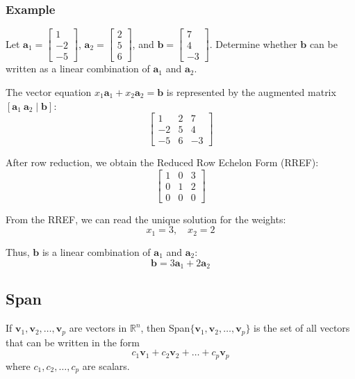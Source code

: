\documentclass[../linear-algebra.tex]{subfiles}
\begin{document}
\subsubsection{Example} 
Let $\mathbf{a}_1 = \begin{bmatrix} 1 \\ -2 \\ -5 \end{bmatrix}$, 
$\mathbf{a}_2 = \begin{bmatrix} 2 \\ 5 \\ 6 \end{bmatrix}$, and 
$\mathbf{b} = \begin{bmatrix} 7 \\ 4 \\ -3 \end{bmatrix}$. 
Determine whether $\mathbf{b}$ can be written as a linear combination of $\mathbf{a}_1$ and $\mathbf{a}_2$.

\noindent The vector equation $x_1\mathbf{a}_1 + x_2\mathbf{a}_2 = \mathbf{b}$ is represented by the augmented matrix $[ \mathbf{a}_1 \ \mathbf{a}_2 \mid \mathbf{b} ]$:
\[
\left[
\begin{array}{cc|c}
    1 & 2 & 7 \\
    -2 & 5 & 4 \\
    -5 & 6 & -3
\end{array}
\right]
\]

After row reduction, we obtain the Reduced Row Echelon Form (RREF):
\[
\left[
\begin{array}{cc|c}
    1 & 0 & 3 \\
    0 & 1 & 2 \\
    0 & 0 & 0
\end{array}
\right]
\]

From the RREF, we can read the unique solution for the weights:
\[
x_1 = 3, \quad x_2 = 2
\]

Thus, $\mathbf{b}$ is a linear combination of $\mathbf{a}_1$ and $\mathbf{a}_2$:
\[
\mathbf{b} = 3\mathbf{a}_1 + 2\mathbf{a}_2
\]

\subsection{Span}
If $\mathbf{v}_1,\mathbf{v}_2,\ldots,\mathbf{v}_p$ are vectors in $\mathbb{R}^n$,
then Span$\{\mathbf{v}_1,\mathbf{v}_2,\ldots,\mathbf{v}_p\}$ is the set of all vectors that can be
written in the form
\[c_1\mathbf{v}_1 + c_2\mathbf{v}_2 + \ldots + c_p\mathbf{v}_p\]
where $c_1,c_2,\ldots,c_p$ are scalars.
\end{document}
